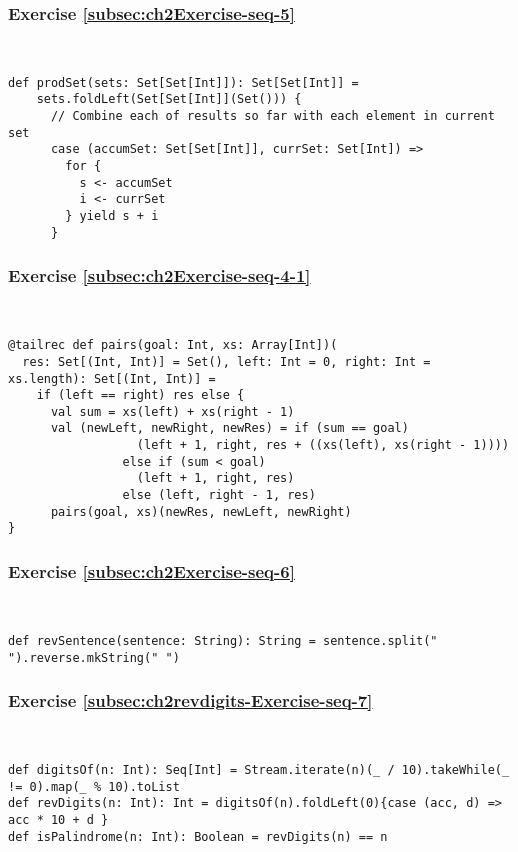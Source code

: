\subsubsection*{Exercise \ref{subsec:ch2Exercise-seq-5}}

~
\begin{lstlisting}
def prodSet(sets: Set[Set[Int]]): Set[Set[Int]] =
    sets.foldLeft(Set[Set[Int]](Set())) {
      // Combine each of results so far with each element in current set
      case (accumSet: Set[Set[Int]], currSet: Set[Int]) =>
        for {
          s <- accumSet
          i <- currSet
        } yield s + i
      }
\end{lstlisting}


\subsubsection*{Exercise \ref{subsec:ch2Exercise-seq-4-1}}

~
\begin{lstlisting}
@tailrec def pairs(goal: Int, xs: Array[Int])(
  res: Set[(Int, Int)] = Set(), left: Int = 0, right: Int = xs.length): Set[(Int, Int)] =
    if (left == right) res else {
      val sum = xs(left) + xs(right - 1)
      val (newLeft, newRight, newRes) = if (sum == goal) 
                  (left + 1, right, res + ((xs(left), xs(right - 1)))) 
                else if (sum < goal)
                  (left + 1, right, res)
                else (left, right - 1, res)
      pairs(goal, xs)(newRes, newLeft, newRight)
}
\end{lstlisting}


\subsubsection*{Exercise \ref{subsec:ch2Exercise-seq-6}}

~
\begin{lstlisting}
def revSentence(sentence: String): String = sentence.split(" ").reverse.mkString(" ")
\end{lstlisting}


\subsubsection*{Exercise \ref{subsec:ch2revdigits-Exercise-seq-7}}

~
\begin{lstlisting}
def digitsOf(n: Int): Seq[Int] = Stream.iterate(n)(_ / 10).takeWhile(_ != 0).map(_ % 10).toList
def revDigits(n: Int): Int = digitsOf(n).foldLeft(0){case (acc, d) => acc * 10 + d }
def isPalindrome(n: Int): Boolean = revDigits(n) == n
\end{lstlisting}



